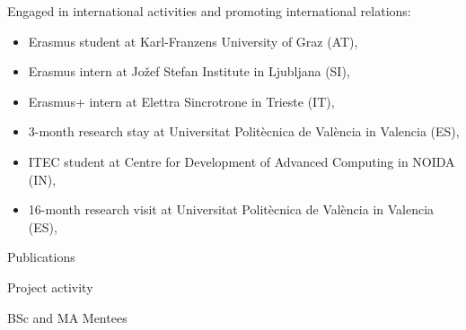 \begin{frame}{\insertsection}
    Engaged in international activities and promoting international relations:
    \begin{itemize}
        \item Erasmus student at \alert{Karl-Franzens University of Graz} (AT),
        \item Erasmus intern at \alert{Jožef Stefan Institute in Ljubljana} (SI), 
        \item Erasmus+ intern at \alert{Elettra Sincrotrone in Trieste} (IT), 
        \item 3-month research stay at \alert{Universitat Politècnica de València in Valencia} (ES),
        \item ITEC student at \alert{Centre for Development of Advanced Computing in NOIDA} (IN),
        \item 16-month research visit at \alert{Universitat Politècnica de València in Valencia} (ES),
    \end{itemize}
\end{frame}

\begin{frame}{\insertsection}
    \centering
    \begin{multicols}{3}
        Publications

        \medskip{}

        \columnbreak
        
        Project activity

        \medskip{}

        \columnbreak
        
        BSc and MA Mentees

        \medskip{}
    \end{multicols}
\end{frame}